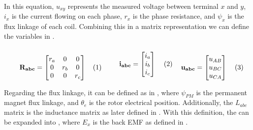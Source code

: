 In this equation, $u_{xy}$ represents the measured voltage between terminal $x$ and $y$, $i_x$ is the current flowing on each phase, $r_x$ is the phase resistance, and $\psi_x$ is the flux linkage of each coil. Combining this in a matrix representation we can define the variables in .

\vspace{0.5cm}
\begin{subequations}
	\noindent\begin{minipage}{.38\linewidth}
		\begin{equation}
			\mathbf{R_{abc}} = \begin{bmatrix}
				r_a & 0   & 0   \\
				0   & r_b & 0   \\
				0   & 0   & r_c \\
			\end{bmatrix}
		\end{equation}
	\end{minipage}%
	\begin{minipage}{.3\linewidth}
		\begin{equation}
			\mathbf{i_{abc}} = \begin{bmatrix}
				i_a \\
				i_b \\
				i_c \\
			\end{bmatrix}
		\end{equation}
	\end{minipage}%
	\begin{minipage}{.3\linewidth}
		\begin{equation}
			\mathbf{u_{abc}} = \begin{bmatrix}
				u_{AB} \\
				u_{BC} \\
				u_{CA} \\
			\end{bmatrix}
		\end{equation}
	\end{minipage}%
	\label{eq:variables_abc}
\end{subequations}
\vspace{0.5cm}

Regarding the flux linkage, it can be defined as in , where $\psi_{PM}$ is the permanent magnet flux linkage, and $\theta_e$ is the rotor electrical position. Additionally, the $L_{abc}$ matrix is the inductance matrix as later defined in . With this definition, the  can be expanded into , where $E_x$ is the back EMF as defined in .

